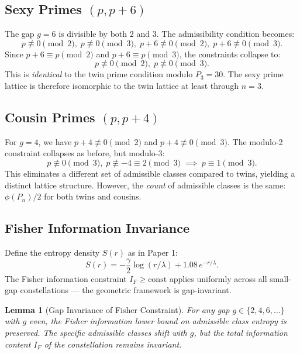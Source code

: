 \documentclass[10pt,a4paper]{article}
\newtheorem{lemma}{Lemma}[section]
\theoremstyle{remark}
\begin{document}
\subsection{Sexy Primes $(p, p+6)$}

The gap $g = 6$ is divisible by both $2$ and $3$. The admissibility condition becomes:
\begin{equation}
    p \not\equiv 0 \pmod{2},\; p \not\equiv 0 \pmod{3},\; p + 6 \not\equiv 0 \pmod{2},\;
    p + 6 \not\equiv 0 \pmod{3}.
\end{equation}
Since $p + 6 \equiv p \pmod{2}$ and $p + 6 \equiv p \pmod{3}$, the constraints collapse to:
\begin{equation}
    p \not\equiv 0 \pmod{2},\; p \not\equiv 0 \pmod{3}.
\end{equation}
This is \emph{identical} to the twin prime condition modulo $P_3 = 30$. The sexy prime
lattice is therefore isomorphic to the twin lattice at least through $n = 3$.

\subsection{Cousin Primes $(p, p+4)$}

For $g = 4$, we have $p + 4 \not\equiv 0 \pmod{2}$ and $p + 4 \not\equiv 0 \pmod{3}$.
The modulo-2 constraint collapses as before, but modulo-3:
\begin{equation}
    p \not\equiv 0 \pmod{3},\; p \not\equiv -4 \equiv 2 \pmod{3}
    \;\implies\; p \equiv 1 \pmod{3}.
\end{equation}
This eliminates a different set of admissible classes compared to twins, yielding a
distinct lattice structure. However, the \emph{count} of admissible classes is the same:
$\phi(P_n)/2$ for both twins and cousins.

\subsection{Fisher Information Invariance}

Define the entropy density $S(r)$ as in Paper 1:
\begin{equation}
    S(r) = -\frac{\gamma}{2} \log(r/\lambda) + 1.08\,e^{-r/\lambda}.
\end{equation}
The Fisher information constraint $I_F \geq \text{const}$ applies uniformly across all
small-gap constellations — the geometric framework is gap-invariant.

\begin{lemma}[Gap Invariance of Fisher Constraint]
For any gap $g \in \{2, 4, 6, \ldots\}$ with $g$ even, the Fisher information lower
bound on admissible class entropy is preserved. The specific admissible classes shift
with $g$, but the total information content $I_F$ of the constellation remains invariant.
\end{lemma}
\end{document}
